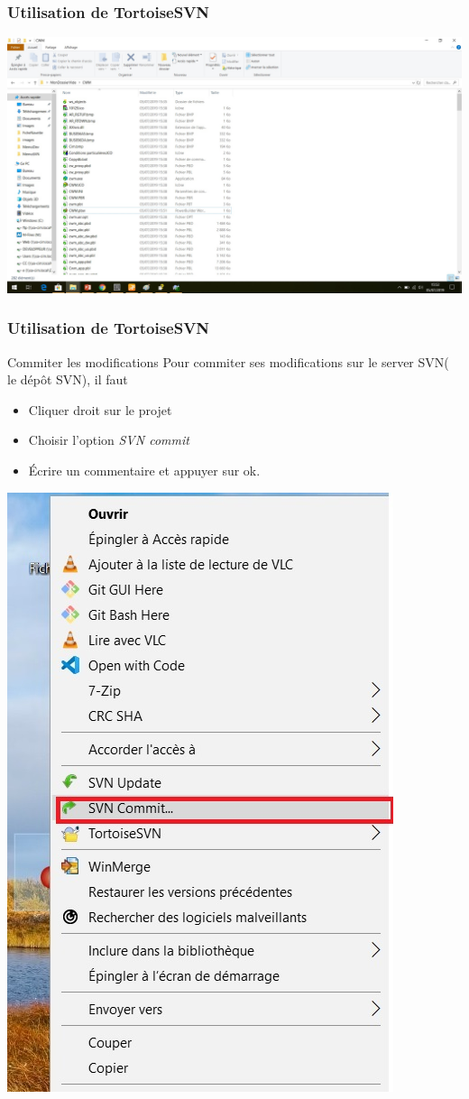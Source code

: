 \documentclass{beamer}
\begin{document}
\begin{frame}
\frametitle{Utilisation de TortoiseSVN}
\includegraphics[scale=0.25]{../images/checkout4.jpg}
\end{frame}
\begin{frame}
\frametitle{Utilisation de TortoiseSVN}
\begin{block}{Commiter les modifications}
Pour commiter ses modifications sur le server SVN( le dépôt SVN), il faut
\begin{itemize}
\item Cliquer droit sur le projet
\item Choisir l'option \alert{\textit{SVN commit}}
\item Écrire un commentaire et appuyer sur ok.
\end{itemize}
\end{block}
\includegraphics[scale=.3]{../images/commit5.jpg}
\end{frame}
\end{document}
